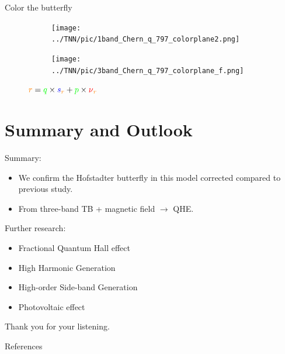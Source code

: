\documentclass[aspectratio=169,compress,x11names]{beamer}
\begin{document}
	\begin{frame}{Color the butterfly}
		\begin{figure}
			\captionsetup{labelformat=empty}
			\centering
			\begin{subfigure}[b]{0.495\textwidth}
				\centering
				{\texttt{[image: ../TNN/pic/1band\_Chern\_q\_797\_colorplane2.png]}}
			\end{subfigure}
			\begin{subfigure}[b]{0.495\textwidth}
				\centering
				\texttt{[image: ../TNN/pic/3band\_Chern\_q\_797\_colorplane\_f.png]}
			\end{subfigure}
			\caption{${\color{orange}r} = {\color{green}q} \times {\color{blue}s}{\color{orange}_{r}} + {\color{green}p} \times {\color{red}\nu}\color{orange}{_{r}}$}
		\end{figure}
	\end{frame}
	\section{Summary and Outlook}
	\begin{frame}
		\begin{block}{Summary:}
			\begin{itemize}
				\item We confirm the Hofstadter butterfly in this model corrected compared to previous study.\\
				\item From three-band TB + magnetic field $\to$ QHE.
			\end{itemize}
		\end{block}
		\begin{exampleblock}{Further research:}
			\begin{itemize}
				\item Fractional Quantum Hall effect
				\item High Harmonic Generation
				\item High-order Side-band Generation
				\item Photovoltaic effect
			\end{itemize}
		\end{exampleblock}
		\begin{multicols}{2}
			\begin{center}
				\null\vfill
				Thank you for your listening.
				\null\vfill
			\end{center}\columnbreak
		\end{multicols}
	\end{frame}
	\begin{frame}{References}
		\printbibliography
	\end{frame}
\end{document}
